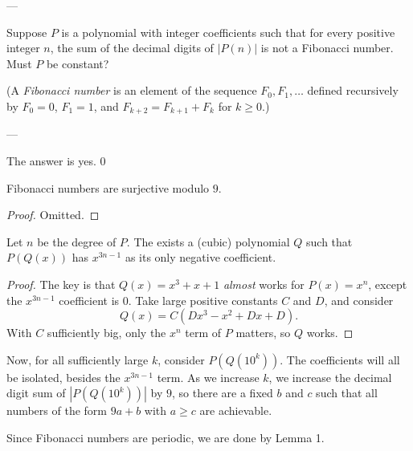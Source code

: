 
---

Suppose $P$ is a polynomial with integer coefficients such that for every positive integer $n$, the sum of the decimal digits of $|P(n)|$ is not a Fibonacci number. Must $P$ be constant?

(A \emph{Fibonacci number} is an element of the sequence $F_0,F_1,\ldots$ defined recursively by $F_0=0$, $F_1=1$, and $F_{k+2}=F_{k+1}+F_k$ for $k\ge 0$.)

---

The answer is yes.
\setcounter{boxlemma}0
\begin{boxlemma}
    Fibonacci numbers are surjective modulo $9$.
\end{boxlemma}
\begin{proof}
    Omitted.
\end{proof}
\begin{boxlemma}
    Let $n$ be the degree of $P$. The exists a (cubic) polynomial $Q$ such that $P(Q(x))$ has $x^{3n-1}$ as its only negative coefficient.
\end{boxlemma}
\begin{proof}
    The key is that $Q(x)=x^3+x+1$ \emph{almost} works for $P(x)=x^n$, except the $x^{3n-1}$ coefficient is $0$. Take large positive constants $C$ and $D$, and consider $$Q(x)=C(Dx^3-x^2+Dx+D).$$
    With $C$ sufficiently big, only the $x^n$ term of $P$ matters, so $Q$ works.
\end{proof}

Now, for all sufficiently large $k$, consider $P(Q(10^k))$. The coefficients will all be isolated, besides the $x^{3n-1}$ term. As we increase $k$, we increase the decimal digit sum of $|P(Q(10^k))|$ by $9$, so there are a fixed $b$ and $c$ such that all numbers of the form $9a+b$ with $a\ge c$ are achievable.

Since Fibonacci numbers are periodic, we are done by Lemma 1.

